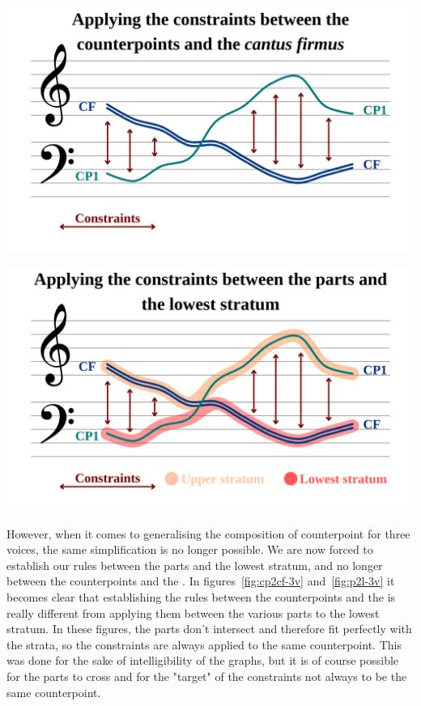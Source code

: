 \vspace{.5cm}
\begin{minipage}{0.46\textwidth}
    \centering
    \includegraphics[width=\textwidth]{Images/cp2cf-2v.png}
    \label{fig:cp2cf-2v}
    \end{minipage}
    \hfill
    \begin{minipage}{0.46\textwidth}
      \centering
      \includegraphics[width=\textwidth]{Images/p2l-2v.png}
      \label{fig:p2l-2v}
\end{minipage}
\vspace{.5cm}

However, when it comes to generalising the composition of counterpoint for three voices, the same simplification is no longer possible. We are now forced to establish our rules between the parts and the lowest stratum, and no longer between the counterpoints and the \cf. In figures~\ref{fig:cp2cf-3v} and~\ref{fig:p2l-3v} it becomes clear that establishing the rules between the counterpoints and the \cfs is really different from applying them between the various parts to the lowest stratum. In these figures, the parts don't intersect and therefore fit perfectly with the strata, so the constraints are always applied to the same counterpoint. This was done for the sake of intelligibility of the graphs, but it is of course possible for the parts to cross and for the "target" of the constraints not always to be the same counterpoint.

